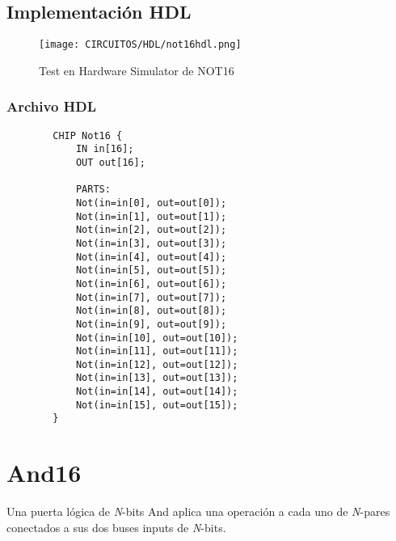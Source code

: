 \documentclass[12pt]{article}
\begin{document}
    \subsection{Implementación HDL}
        \begin{figure}[H]
            \centering
            \texttt{[image: CIRCUITOS/HDL/not16hdl.png]}
            \caption{Test en Hardware Simulator de NOT16 \cite{nand2tetris}}
            \label{fig:hdlnot16}
        \end{figure}

        \subsubsection{Archivo HDL}
            \begin{lstlisting}
        CHIP Not16 {
            IN in[16];
            OUT out[16];
        
            PARTS:
            Not(in=in[0], out=out[0]);
            Not(in=in[1], out=out[1]);
            Not(in=in[2], out=out[2]);
            Not(in=in[3], out=out[3]);
            Not(in=in[4], out=out[4]);
            Not(in=in[5], out=out[5]);
            Not(in=in[6], out=out[6]);
            Not(in=in[7], out=out[7]);
            Not(in=in[8], out=out[8]);
            Not(in=in[9], out=out[9]);
            Not(in=in[10], out=out[10]);
            Not(in=in[11], out=out[11]);
            Not(in=in[12], out=out[12]);
            Not(in=in[13], out=out[13]);
            Not(in=in[14], out=out[14]);
            Not(in=in[15], out=out[15]);
        }
            \end{lstlisting}
    \newpage


\section{And16}
    Una puerta lógica de \textit{N}-bits And aplica una operación a cada uno de \textit{N}-pares conectados a sus dos buses inputs de \textit{N}-bits. \cite{nisan_nand2tetris_2005}
\end{document}
